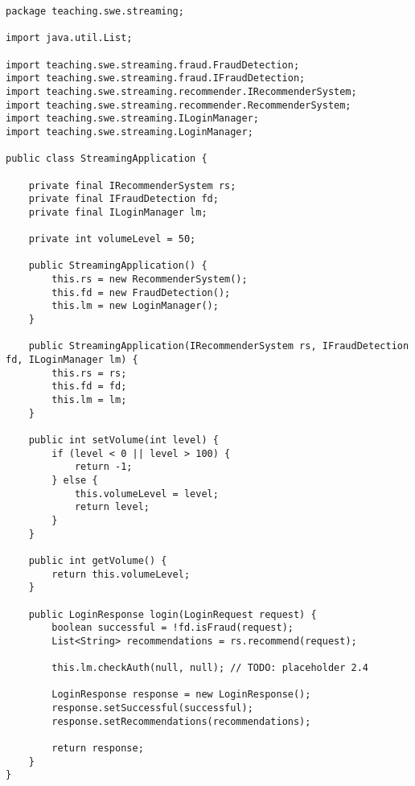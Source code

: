\begin{lstlisting}[style=javastyle, caption=Dependency Injection des ILoginManagers in SA]
package teaching.swe.streaming;

import java.util.List;

import teaching.swe.streaming.fraud.FraudDetection;
import teaching.swe.streaming.fraud.IFraudDetection;
import teaching.swe.streaming.recommender.IRecommenderSystem;
import teaching.swe.streaming.recommender.RecommenderSystem;
import teaching.swe.streaming.ILoginManager;
import teaching.swe.streaming.LoginManager;

public class StreamingApplication {

    private final IRecommenderSystem rs;
    private final IFraudDetection fd;
    private final ILoginManager lm;

    private int volumeLevel = 50;

    public StreamingApplication() {
        this.rs = new RecommenderSystem();
        this.fd = new FraudDetection();
        this.lm = new LoginManager();
    }

    public StreamingApplication(IRecommenderSystem rs, IFraudDetection fd, ILoginManager lm) {
        this.rs = rs;
        this.fd = fd;
        this.lm = lm;
    }

    public int setVolume(int level) {
        if (level < 0 || level > 100) {
            return -1;
        } else {
            this.volumeLevel = level;
            return level;
        }
    }

    public int getVolume() {
        return this.volumeLevel;
    }

    public LoginResponse login(LoginRequest request) {
        boolean successful = !fd.isFraud(request);
        List<String> recommendations = rs.recommend(request);

        this.lm.checkAuth(null, null); // TODO: placeholder 2.4

        LoginResponse response = new LoginResponse();
        response.setSuccessful(successful);
        response.setRecommendations(recommendations);

        return response;
    }
}

\end{lstlisting}


